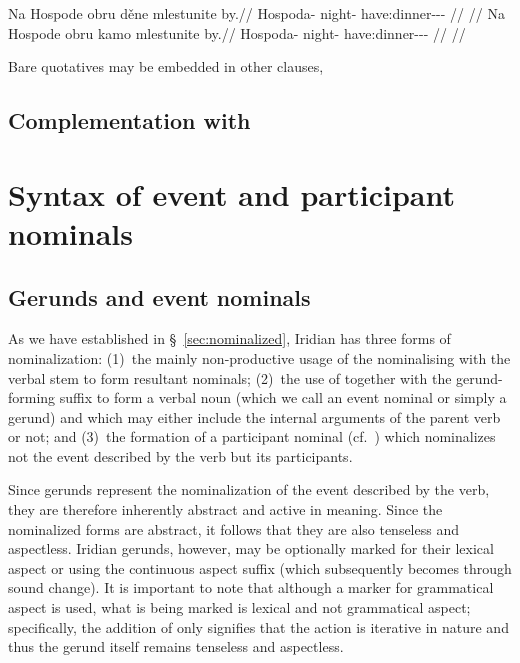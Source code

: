 \pex
\a
\begingl
  \gla Na Hospode obru děne mlestunite by.//
  \glb \Loc{} Hospoda-\Acc{} night-\Ins{} \Spec{} have:dinner-\Lv{}-\SupP{}-\Cnj{} \Quot{}//
  \glft {}//
\endgl
\a
\begingl
  \gla Na Hospode obru kamo mlestunite by.//
  \glb \Loc{} Hospoda-\Acc{} night-\Ins{} \Rep{} have:dinner-\Lv{}-\SupP{}-\Cnj{} \Quot{}//
  \glft {}//
\endgl
\xe

Bare quotatives may be embedded in other clauses,



\subsection{Complementation with }
\label{sec:complementation-no}

\section{Syntax of event and participant nominals}\label{sec:nomz-syntax}

\subsection{Gerunds and event nominals}

As we have established in \S~\ref{sec:nominalized}, Iridian has three forms of
nominalization: (1)~the mainly non-productive usage of the
nominalising  with the verbal stem to form resultant nominals; (2)~the
use of  together with the gerund-forming suffix 
to form a verbal noun (which we call an event nominal or simply a gerund) and
which may either include the internal arguments of the parent verb or not; and
(3)~the formation of a participant nominal (cf.~\cite{okuna}) which nominalizes
not the event described by the verb but its participants.

Since gerunds represent the nominalization of the
event described by the verb, they are therefore inherently
abstract and active in meaning. Since the nominalized forms are abstract, it
follows that they are also tenseless and aspectless. Iridian gerunds, however,
may be optionally marked for their lexical aspect or 
 using the continuous aspect suffix 
(which subsequently becomes  through sound change). It is important to
note that although a marker for grammatical aspect is used,
what is being marked is lexical and not grammatical aspect; specifically, the
addition of  only signifies that the action is iterative in nature and
thus the gerund itself remains tenseless and aspectless.

